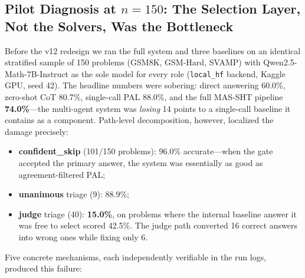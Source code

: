 \documentclass[11pt,a4paper]{article}
\begin{document}
\subsection{Pilot Diagnosis at $n{=}150$: The Selection Layer, Not the Solvers, Was the Bottleneck}
\label{sec:pilot_diagnosis}
Before the v12 redesign we ran the full system and three baselines on an identical stratified sample of 150 problems (GSM8K, GSM-Hard, SVAMP) with Qwen2.5-Math-7B-Instruct as the sole model for every role (\texttt{local\_hf} backend, Kaggle GPU, seed 42).
The headline numbers were sobering: direct answering 60.0\%, zero-shot CoT 80.7\%, single-call PAL 88.0\%, and the full MAS-SHT pipeline \textbf{74.0\%}---the multi-agent system was \emph{losing} 14 points to a single-call baseline it contains as a component.
Path-level decomposition, however, localized the damage precisely:
\begin{itemize}[leftmargin=*,itemsep=2pt]
    \item \textbf{confident\_skip} (101/150 problems): 96.0\% accurate---when the gate accepted the primary answer, the system was essentially as good as agreement-filtered PAL;
    \item \textbf{unanimous} triage (9): 88.9\%;
    \item \textbf{judge} triage (40): \textbf{15.0\%}, on problems where the internal baseline answer it was free to select scored 42.5\%. The judge path converted 16 correct answers into wrong ones while fixing only 6.
\end{itemize}
Five concrete mechanisms, each independently verifiable in the run logs, produced this failure:
\end{document}
